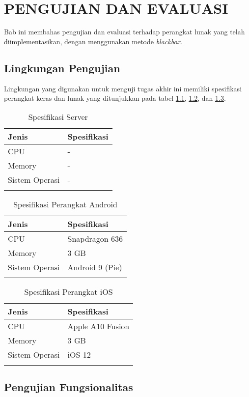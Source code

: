 \chapter{PENGUJIAN DAN EVALUASI}
\par Bab ini membahas pengujian dan evaluasi terhadap perangkat lunak yang telah diimplementasikan, dengan menggunakan metode \textit{blackbox}.

\section{Lingkungan Pengujian}
\par Lingkungan yang digunakan untuk menguji tugas akhir ini memiliki spesifikasi perangkat keras dan lunak yang ditunjukkan pada tabel \ref{5:tabel_spesifikasi_server}, \ref{5:tabel_spesifikasi_perangkat_android}, dan \ref{5:tabel_spesifikasi_perangkat_ios}.
\begin{longtable}{|p{2.5cm}|p{6.5cm}|}
    \hline
    \textbf{Jenis} & \textbf{Spesifikasi} \\ \hline
    CPU & - \\ \hline
    Memory & - \\ \hline
    Sistem Operasi & - \\ \hline
    \caption{Spesifikasi Server}
    \label{5:tabel_spesifikasi_server}
\end{longtable}
\begin{longtable}{|p{2.5cm}|p{6.5cm}|}
    \hline
    \textbf{Jenis} & \textbf{Spesifikasi} \\ \hline
    CPU & Snapdragon 636 \\ \hline
    Memory & 3 GB \\ \hline
    Sistem Operasi & Android 9 (Pie) \\ \hline
    \caption{Spesifikasi Perangkat Android}
    \label{5:tabel_spesifikasi_perangkat_android}
\end{longtable}
\begin{longtable}{|p{2.5cm}|p{6.5cm}|}
    \hline
    \textbf{Jenis} & \textbf{Spesifikasi} \\ \hline
    CPU & Apple A10 Fusion \\ \hline
    Memory & 3 GB \\ \hline
    Sistem Operasi & iOS 12 \\ \hline
    \caption{Spesifikasi Perangkat iOS}
    \label{5:tabel_spesifikasi_perangkat_ios}
\end{longtable}

\section{Pengujian Fungsionalitas}

